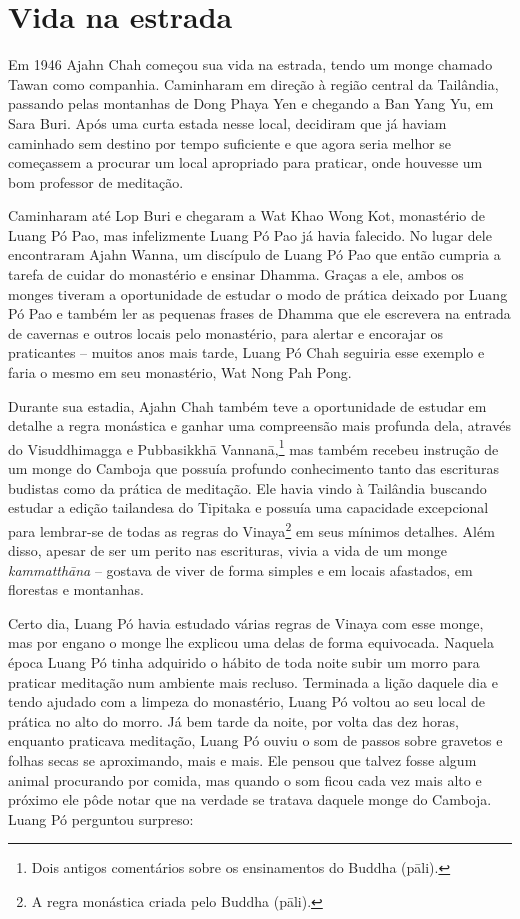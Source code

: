 \chapter{Vida na estrada}

Em 1946 Ajahn Chah começou sua vida na estrada, tendo um monge chamado
Tawan como companhia. Caminharam em direção à região central da
Tailândia, passando pelas montanhas de Dong Phaya Yen e chegando a Ban
Yang Yu, em Sara Buri. Após uma curta estada nesse local, decidiram que
já haviam caminhado sem destino por tempo suficiente e que agora seria
melhor se começassem a procurar um local apropriado para praticar, onde
houvesse um bom professor de meditação.

Caminharam até Lop Buri e chegaram a Wat Khao Wong Kot, monastério de
Luang Pó Pao, mas infelizmente Luang Pó Pao já havia falecido. No lugar
dele encontraram Ajahn Wanna, um discípulo de Luang Pó Pao que então
cumpria a tarefa de cuidar do monastério e ensinar Dhamma. Graças a ele,
ambos os monges tiveram a oportunidade de estudar o modo de prática
deixado por Luang Pó Pao e também ler as pequenas frases de Dhamma que
ele escrevera na entrada de cavernas e outros locais pelo monastério,
para alertar e encorajar os praticantes -- muitos anos mais tarde, Luang
Pó Chah seguiria esse exemplo e faria o mesmo em seu monastério, Wat
Nong Pah Pong.

Durante sua estadia, Ajahn Chah também teve a oportunidade de estudar em
detalhe a regra monástica e ganhar uma compreensão mais profunda dela,
através do Visuddhimagga e \mbox{Pubbasikkhā} \mbox{Vannanā},\footnote{Dois antigos
  comentários sobre os ensinamentos do Buddha (pāli).} mas também
recebeu instrução de um monge do Camboja que possuía profundo
conhecimento tanto das escrituras budistas como da prática de meditação.
Ele havia vindo à Tailândia buscando estudar a edição tailandesa do
Tipitaka e possuía uma capacidade excepcional para lembrar-se de todas
as regras do Vinaya\footnote{A regra monástica criada pelo Buddha
  (pāli).} em seus mínimos detalhes. Além disso, apesar de ser um perito
nas escrituras, vivia a vida de um monge \emph{kammatthāna} -- gostava
de viver de forma simples e em locais afastados, em florestas e
montanhas.

Certo dia, Luang Pó havia estudado várias regras de Vinaya com esse
monge, mas por engano o monge lhe explicou uma delas de forma
equivocada. Naquela época Luang Pó tinha adquirido o hábito de toda
noite subir um morro para praticar meditação num ambiente mais recluso.
Terminada a lição daquele dia e tendo ajudado com a limpeza do
monastério, Luang Pó voltou ao seu local de prática no alto do morro. Já
bem tarde da noite, por volta das dez horas, enquanto praticava
meditação, Luang Pó ouviu o som de passos sobre gravetos e folhas secas
se aproximando, mais e mais. Ele pensou que talvez fosse algum animal
procurando por comida, mas quando o som ficou cada vez mais alto e
próximo ele pôde notar que na verdade se tratava daquele monge do
Camboja. Luang Pó perguntou surpreso:

